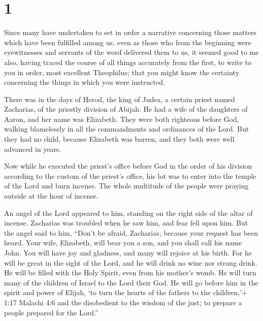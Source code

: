 \hypertarget{section}{%
\section{1}\label{section}}

 Since many have undertaken to set in order a narrative
concerning those matters which have been fulfilled among us,
 even as those who from the beginning were eyewitnesses and
servants of the word delivered them to us,  it seemed good
to me also, having traced the course of all things accurately from the
first, to write to you in order, most excellent Theophilus; 
that you might know the certainty concerning the things in which you
were instructed.

 There was in the days of Herod, the king of Judea, a
certain priest named Zacharias, of the priestly division of Abijah. He
had a wife of the daughters of Aaron, and her name was Elizabeth.
 They were both righteous before God, walking blamelessly in
all the commandments and ordinances of the Lord.  But they
had no child, because Elizabeth was barren, and they both were well
advanced in years.

 Now while he executed the priest's office before God in the
order of his division  according to the custom of the
priest's office, his lot was to enter into the temple of the Lord and
burn incense.  The whole multitude of the people were
praying outside at the hour of incense.

 An angel of the Lord appeared to him, standing on the
right side of the altar of incense.  Zacharias was troubled
when he saw him, and fear fell upon him.  But the angel
said to him, ``Don't be afraid, Zacharias, because your request has been
heard. Your wife, Elizabeth, will bear you a son, and you shall call his
name John.  You will have joy and gladness, and many will
rejoice at his birth.  For he will be great in the sight of
the Lord, and he will drink no wine nor strong drink. He will be filled
with the Holy Spirit, even from his mother's womb.  He will
turn many of the children of Israel to the Lord their God. 
He will go before him in the spirit and power of Elijah, `to turn the
hearts of the fathers to the children,'+ 1:17 Malachi 4:6 and the
disobedient to the wisdom of the just; to prepare a people prepared for
the Lord.''


